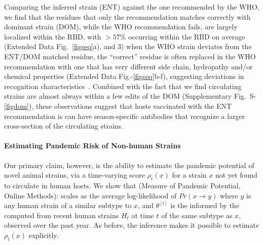 \documentclass[onecolumn, compsoc,12pt]{IEEEtran}
\def\SUPPLEMENTARY{Supplementary\xspace}
\def\METHODS{Online Methods\xspace}
\def\EXTENDED{Extended Data\xspace}
\begin{document}
Comparing the \enet inferred strain (ENT) against the one recommended by the WHO, we find that the residues that only the  \enet recommendation matches correctly with dominant strain (DOM), while the WHO recommendation fails,  are largely localized within the RBD, with $>57\%$ occurring within  the RBD on average (\EXTENDED Fig.~\ref{figseq}a), and 3) when the WHO strain deviates from  the ENT/DOM   matched residue, the ``correct'' residue is often replaced  in the WHO recommendation with one that has very different side chain, hydropathy  and/or chemical properties (\EXTENDED Fig.-\ref{figseq}b-f), suggesting deviations in recognition characteristics~\cite{carugo2001normalized,righetto2014comparative}. Combined with the fact that we find circulating strains are almost always within a few edits of the DOM (\SUPPLEMENTARY Fig.~S-\ref{figdom}), these observations suggest that  hosts vaccinated with the ENT recommendation is can have season-specific antibodies that recognize a larger cross-section of the circulating strains.

\paragraph*{Estimating Pandemic Risk of Non-human Strains}
Our primary claim, however,  is the ability to estimate the pandemic potential of novel animal strains, via a  time-varying \erisk score $\rho_t(x)$ for a strain $x$ not yet found to circulate in human hosts. We show that (Measure of Pandemic Potential, \METHODS):%
%
scales as the average log-likelihood of $Pr(x \rightarrow y)$ where $y$ is any human strain of a similar subtype to $x$, and  $\theta^{[t]}$ is the \qdist informed by the \enet computed from recent human strains $H_t$ at time $t$ of the same subtype as $x$, observed over the past year. As before, the \enet inference makes it possible to estimate $\rho_t(x)$ explicitly. 
\end{document}
